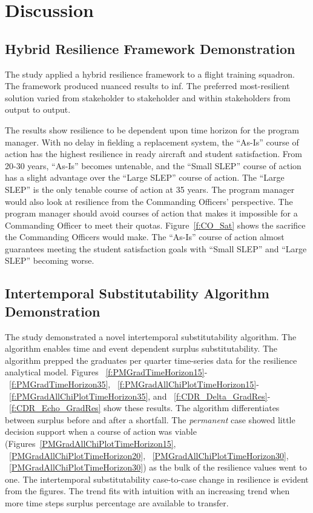 \section{Discussion}
\label{s:Disc}

\subsection{Hybrid Resilience Framework Demonstration}
The study applied a hybrid resilience framework to a flight training
squadron. The framework produced nuanced results to inf. The 
preferred most-resilient solution varied from stakeholder to
stakeholder and within stakeholders from output to output.

The results show resilience to be dependent upon time horizon for the
program manager. With no delay in fielding a replacement system, the
``As-Is'' course of action has the highest resilience in ready
aircraft and student satisfaction. From 20-30 years, ``As-Is'' becomes
untenable, and the ``Small SLEP'' course of action has a slight
advantage over the ``Large SLEP'' course of action. The
``Large SLEP'' is the only tenable course of action at 35 years. The
program manager would also look at resilience from the Commanding
Officers' perspective. The program manager should avoid courses of action that makes it impossible for
a Commanding Officer to meet their quotas. Figure~\ref{f:CO_Sat} shows
the sacrifice the Commanding Officers would make. The ``As-Is'' course
of action almost guarantees meeting the student satisfaction goals
with ``Small SLEP'' and ``Large SLEP'' becoming worse.

\subsection{Intertemporal Substitutability Algorithm Demonstration}

The study demonstrated a novel intertemporal substitutability
algorithm. The algorithm enables time and event dependent
surplus substitutability. The algorithm prepped the graduates per
quarter time-series data for the resilience analytical model. Figures
~\ref{f:PMGradTimeHorizon15}-~\ref{f:PMGradTimeHorizon35},
~\ref{f:PMGradAllChiPlotTimeHorizon15}-~\ref{f:PMGradAllChiPlotTimeHorizon35},
and ~\ref{f:CDR_Delta_GradRes}-~\ref{f:CDR_Echo_GradRes} show these 
results. The algorithm differentiates between surplus before and after
a shortfall. The \emph{permanent} case showed little decision support
when a course of action was viable
(Figures~\ref{PMGradAllChiPlotTimeHorizon15},
~\ref{PMGradAllChiPlotTimeHorizon20},
~\ref{PMGradAllChiPlotTimeHorizon30},
~\ref{PMGradAllChiPlotTimeHorizon30}) as the bulk of the resilience
values went to one.  The intertemporal substitutability case-to-case
change in resilience is evident from the figures. The trend fits with
intuition with an increasing trend when more time steps 
surplus percentage are available to transfer.

